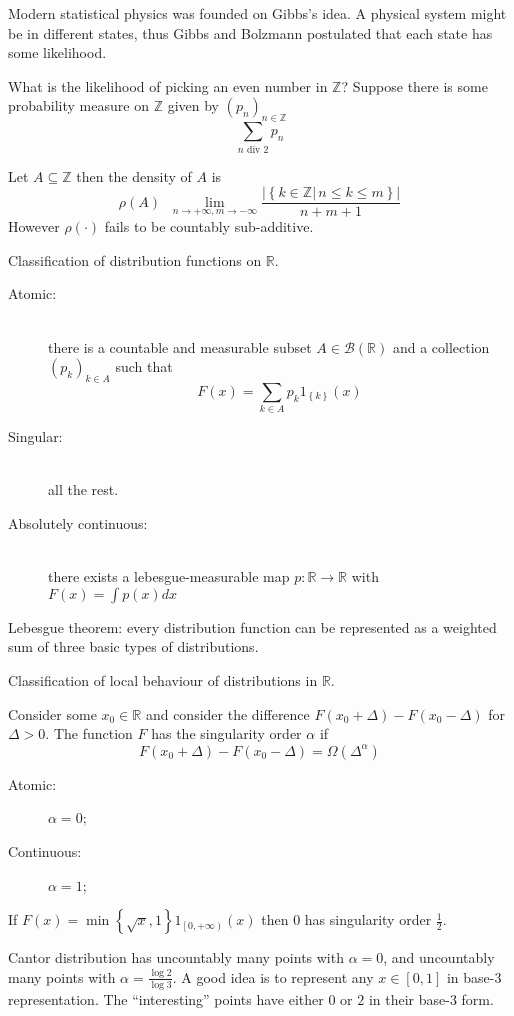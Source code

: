 \documentclass[a4paper]{article}
\newcommand{\obj}[1]{{\left\{ #1 \right \}}}
\newcommand{\clo}[1]{{\left [ #1 \right ]}}
\newcommand{\clop}[1]{{\left [ #1 \right )}}
\newcommand{\brac}[1]{{\left ( #1 \right )}}
\newcommand{\induc}[1]{{\left . #1 \right \vert}}
\newcommand{\abs}[1]{{\left | #1 \right |}}
\newcommand{\Real}{\mathbb{R}}
\newcommand{\borel}{\mathcal{B}}
\newcommand{\defn}{\mathop{\overset{\Delta}{=}}\nolimits}
\begin{document}
Modern statistical physics was founded on Gibbs's idea.
A physical system might be in different states, thus Gibbs and Bolzmann postulated that each state has some likelihood.

What is the likelihood of picking an even number in $\mathbb{Z}$? Suppose there is some probability measure on $\mathbb{Z}$ given by $\brac{p_n}_{n\in \mathbb{Z}}$ 
\[\sum_{n\text{ div } 2} p_n\]

Let $A\subseteq \mathbb{Z}$ then the density of $A$ is \[\rho(A) \defn \lim_{n\to+\infty, m\to -\infty} \frac{\abs{\obj{\induc{k\in \mathbb{Z}}\,n\leq k\leq m }}}{n+m+1}\]
However $\rho(\cdot)$ fails to be countably sub-additive.

Classification of distribution functions on $\Real$. \begin{description}
	\item[Atomic:] \hfill \\
		there is a countable and measurable subset $A\in \borel(\Real)$ and a collection $\brac{p_k}_{k\in A}$ such that
			\[F(x) = \sum_{k\in A} p_k 1_{\obj{k}}(x)\]
	\item[Singular:] \hfill \\
		all the rest. 
	\item[Absolutely continuous:] \hfill \\
		there exists a lebesgue-measurable map $p:\Real\to\Real$ with $F(x)=\int p(x) dx$
\end{description}

Lebesgue theorem: every distribution function can be represented as a weighted sum of three basic types of distributions.


Classification of local behaviour of distributions in $\Real$.

Consider some $x_0\in \Real$ and consider the difference $F(x_0+\Delta)-F(x_0-\Delta)$ for $\Delta > 0$.
The function $F$ has the singularity order $\alpha$ if \[F(x_0+\Delta)-F(x_0-\Delta) = \Omega(\Delta^\alpha)\]

\begin{description}
	\item[Atomic:] $\alpha = 0$;
	\item[Continuous:] $\alpha = 1$;
\end{description}

If $F(x)=\min\obj{\sqrt{x}, 1} 1_{\clop{0,+\infty}}(x)$ then $0$ has singularity order $\frac{1}{2}$.

Cantor distribution has uncountably many points with $\alpha = 0$, and uncountably many points with $\alpha = \frac{\log 2}{\log 3}$.
A good idea is to represent any $x\in \clo{0,1}$ in base-3 representation. The ``interesting'' points have either $0$ or $2$ in their base-3 form.
\end{document}
